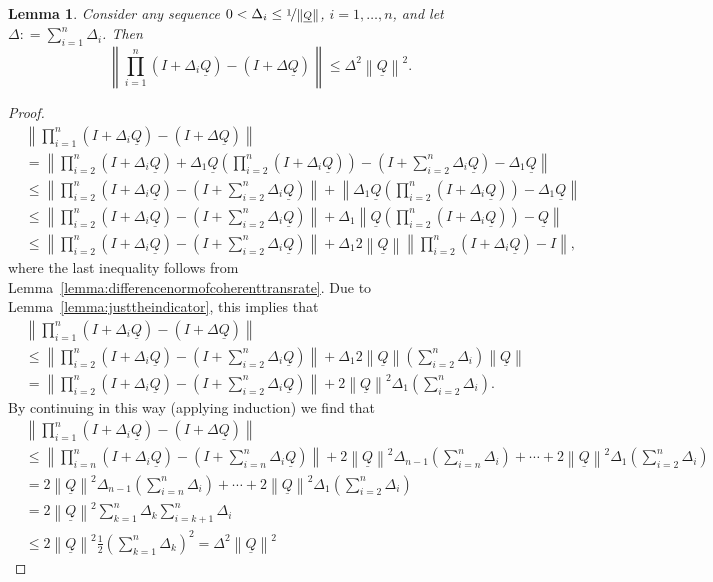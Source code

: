 \documentclass[10pt]{paper}
\newtheorem{lemma}[theorem]{Lemma}
\newcommand{\lrate}{\underline{Q}}
\newcommand{\norm}[1]{\left\lVert #1 \right\rVert}
\newcommand{\coloneqq}{:\!=}
\begin{document}
\begin{lemma}\label{lemma:justthelinearpart_appendix}
Consider any sequence $0<\Delta_i\leq\nicefrac{1}{\norm{\lrate}}$, $i=1,\dots,n$, and let $\Delta\coloneqq\sum_{i=1}^n\Delta_i$. Then
\begin{equation*}
\norm{\prod_{i=1}^n(I+\Delta_i\lrate)-(I+\Delta\lrate)}\leq\Delta^2\norm{\lrate}^2.
\end{equation*}
\end{lemma}
\begin{proof}
\begin{align*}
&\norm{\prod_{i=1}^n(I+\Delta_i\lrate)-(I+\Delta\lrate)}\\
&=\norm{\prod_{i=2}^n(I+\Delta_i\lrate)+\Delta_1\lrate\left(\prod_{i=2}^n(I+\Delta_i\lrate)\right)-(I+\sum_{i=2}^n\Delta_i\lrate)-\Delta_1\lrate}\\
&\leq\norm{\prod_{i=2}^n(I+\Delta_i\lrate)-(I+\sum_{i=2}^n\Delta_i\lrate)}+\norm{\Delta_1\lrate\left(\prod_{i=2}^n(I+\Delta_i\lrate)\right)-\Delta_1\lrate}\\
&\leq\norm{\prod_{i=2}^n(I+\Delta_i\lrate)-(I+\sum_{i=2}^n\Delta_i\lrate)}+\Delta_1\norm{\lrate\left(\prod_{i=2}^n(I+\Delta_i\lrate)\right)-\lrate}\\
&\leq\norm{\prod_{i=2}^n(I+\Delta_i\lrate)-(I+\sum_{i=2}^n\Delta_i\lrate)}+\Delta_1 2\norm{\lrate}\norm{\prod_{i=2}^n(I+\Delta_i\lrate)-I},
\end{align*}
where the last inequality follows from Lemma~\ref{lemma:differencenormofcoherenttransrate}. Due to Lemma~\ref{lemma:justtheindicator}, this implies that
\begin{align*}
&\norm{\prod_{i=1}^n(I+\Delta_i\lrate)-(I+\Delta\lrate)}\\
&\leq\norm{\prod_{i=2}^n(I+\Delta_i\lrate)-(I+\sum_{i=2}^n\Delta_i\lrate)}+\Delta_1 2\norm{\lrate}\left(\sum_{i=2}^n\Delta_i\right)\norm{\lrate}\\
&=\norm{\prod_{i=2}^n(I+\Delta_i\lrate)-(I+\sum_{i=2}^n\Delta_i\lrate)}+2\norm{\lrate}^2\Delta_1\left(\sum_{i=2}^n\Delta_i\right).
\end{align*}
By continuing in this way (applying induction) we find that
\begin{align*}
&\norm{\prod_{i=1}^n(I+\Delta_i\lrate)-(I+\Delta\lrate)}\\
&\leq
\norm{\prod_{i=n}^n(I+\Delta_i\lrate)-(I+\sum_{i=n}^n\Delta_i\lrate)}
+2\norm{\lrate}^2\Delta_{n-1}\left(\sum_{i=n}^n\Delta_i\right)
+\cdots
+2\norm{\lrate}^2\Delta_1\left(\sum_{i=2}^n\Delta_i\right)\\
&=2\norm{\lrate}^2\Delta_{n-1}\left(\sum_{i=n}^n\Delta_i\right)
+\cdots
+2\norm{\lrate}^2\Delta_1\left(\sum_{i=2}^n\Delta_i\right)\\
&=2\norm{\lrate}^2\sum_{k=1}^n\Delta_k\sum_{i=k+1}^n\Delta_i\\
&\leq2\norm{\lrate}^2\frac{1}{2}\left(\sum_{k=1}^n\Delta_k\right)^2=\Delta^2\norm{\lrate}^2
\end{align*}
\end{proof}
\end{document}
